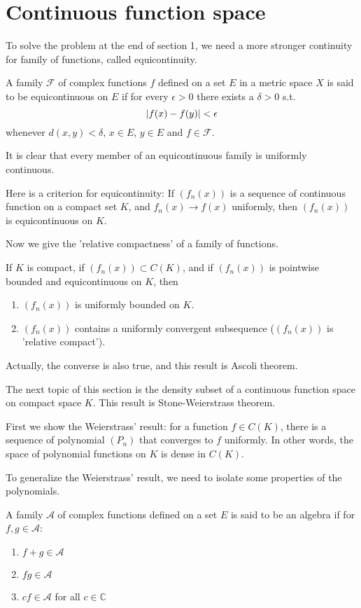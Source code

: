 \section{Continuous function space}
To solve the problem at the end of section 1, we need a more stronger continuity for family of functions, called equicontinuity.\par
\begin{definition}
    A family $\mathscr{F}$ of complex functions $f$ defined on a set $E$ in a metric space $X$ is said to be equicontinuous on $E$ if for every $\epsilon>0$ there exists a $\delta>0$ s.t.
    \begin{equation*}
        \left\lvert f(x)-f(y)\right\rvert<\epsilon
    \end{equation*}
    whenever $d(x,y)<\delta$, $x\in E$, $y\in E$ and $f\in \mathscr{F}$.
\end{definition}
It is clear that every member of an equicontinuous family is uniformly continuous.\par
Here is a criterion for equicontinuity: If $(f_n(x))$ is a sequence of continuous function on a compact set $K$, and $f_n(x)\to f(x)$ uniformly, then $(f_n(x))$ is equicontinuous on $K$.\par
Now we give the 'relative compactness' of a family of functions.
\begin{theorem}
    If $K$ is compact, if $(f_n(x))\subset C(K)$, and if $(f_n(x))$ is pointwise bounded and equicontinuous on $K$, then
    \begin{enumerate}
        \item $(f_n(x))$ is uniformly bounded on $K$.
        \item $(f_n(x))$ contains a uniformly convergent subsequence ($(f_n(x))$ is 'relative compact').
    \end{enumerate}
\end{theorem}
Actually, the converse is also true, and this result is Ascoli theorem.\par
The next topic of this section is the density subset of a continuous function space on compact space $K$. This result is Stone-Weierstrass theorem.\par
First we show the Weierstrass' result: for a function $f\in C(K)$, there is a sequence of polynomial $(P_n)$ that converges to $f$ uniformly. In other words, the space of polynomial functions on $K$ is dense in $C(K)$.\par
To generalize the Weierstrass' result, we need to isolate some properties of the polynomials.
\begin{definition}[algebra]
    A family $\mathscr{A}$ of complex functions defined on a set $E$ is said to be an algebra if for $f, g\in\mathscr{A}$:
    \begin{enumerate}
        \item $f+g\in\mathscr{A}$
        \item $fg\in\mathscr{A}$
        \item $cf\in\mathscr{A}$ for all $c\in \mathbb{C}$
    \end{enumerate}
\end{definition}
